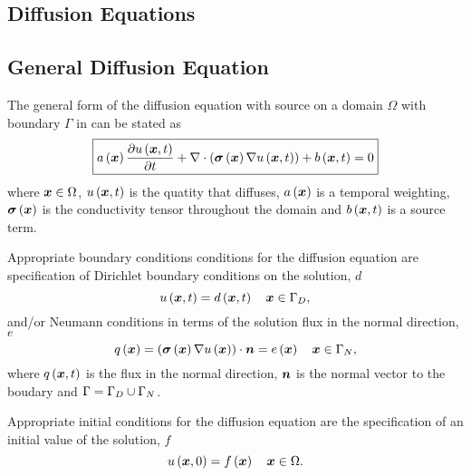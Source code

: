 \subsection{Diffusion Equations} 

\subsection{General Diffusion Equation} 


The general form of the diffusion equation with source on a domain $\Omega$ with boundary
$\Gamma$ in \OpenCMISS can be stated as
\begin{equation}
  \boxed{
    \fnof{a}{\vect{x}}\delby{\fnof{u}{\vect{x},t}}{t}+
    \diverg{\pbrac{\fnof{\tensor{\sigma}}{\vect{x}}\gradient{\fnof{u}{\vect{x},t}}}}+
    \fnof{b}{\vect{x},t}=0  
  }
  \label{eqn:diffusionequation}
\end{equation}
where $\vect{x}\in\Omega$, $\fnof{u}{\vect{x},t}$ is the quatity that diffuses,
$\fnof{a}{\vect{x}}$ is a temporal weighting, $\fnof{\tensor{\sigma}}{\vect{x}}$ is
the conductivity tensor throughout the domain and $\fnof{b}{\vect{x},t}$ is a
source term.

Appropriate boundary conditions conditions for the diffusion
equation are specification of Dirichlet boundary conditions on the solution,
$d$ \ie
\begin{equation}
  \fnof{u}{\vect{x},t} = \fnof{d}{\vect{x},t} \quad \vect{x}\in\Gamma_{D},
  \label{eqn:diffusionDirichletBC} 
\end{equation}
and/or Neumann conditions in terms of the solution flux in the normal
direction, $e$ \ie
\begin{equation}
  \fnof{q}{\vect{x}} = \dotprod{\pbrac{\fnof{\tensor{\sigma}}{\vect{x}}
      \gradient{\fnof{u}{\vect{x}}}}}{\normal} =
  \fnof{e}{\vect{x}} \quad \vect{x}\in\Gamma_{N},
  \label{eqn:diffusionNeumannBC} 
\end{equation}
where $\fnof{q}{\vect{x},t}$ is the flux in the normal direction, $\normal$ is the normal
vector to the boudary and $\Gamma=\Gamma_{D}\cup\Gamma_{N}$.

Appropriate initial conditions for the diffusion equation are the
specification of an initial value of the solution, $f$ \ie
\begin{equation}
  \fnof{u}{\vect{x},0} = \fnof{f}{\vect{x}} \quad \vect{x}\in\Omega.
  \label{eqn:diffusionInitialC} 
\end{equation}

